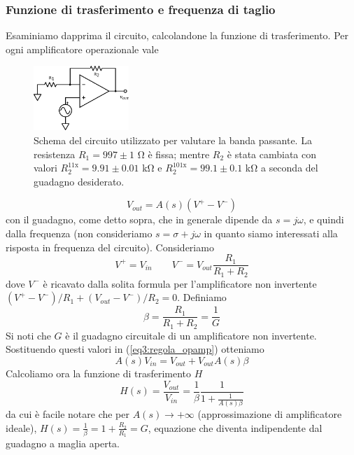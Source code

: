 \subsubsection*{Funzione di trasferimento e frequenza di taglio}

Esaminiamo dapprima il circuito, calcolandone la funzione di trasferimento. Per ogni amplificatore operazionale vale
\begin{figure}
  \begin{center}
    \includegraphics[width=0.32\textwidth]{../E03/latex/bandwidth.pdf}
  \end{center}
  \caption{Schema del circuito utilizzato per valutare la banda passante. La resistenza $R_1=997\pm1$ \si{\ohm} è fissa; mentre $R_2$ è stata cambiata con valori $R_2^{11\mathrm{x}}=9.91 \pm 0.01$ \si{\kilo\ohm} e $R_2^{101\mathrm{x}}=99.1 \pm 0.1$ \si{\kilo\ohm} a seconda del guadagno desiderato.}
  \label{cir3:banda}
\end{figure}
\begin{equation}
V_{out}=A(s) (V^+-V^-)
\label{eq3:regola_opamp}
\end{equation}
con il guadagno, come detto sopra, che in generale dipende da $s=j\omega$, e quindi dalla frequenza (non consideriamo $s=\sigma + j\omega$ in quanto siamo interessati alla risposta in frequenza del circuito). Consideriamo
$$V^+ = V_{in} \qquad V^-=V_{out} \frac{R_1}{R_1+R_2}$$
dove $V^-$ è ricavato dalla solita formula per l'amplificatore non invertente $(V^+-V^-)/R_1 + (V_{out}-V^-)/R_2 =0$. Definiamo
$$\beta = \frac{R_1}{R_1+R_2} = \frac{1}{G}$$
Si noti che $G$ è il guadagno circuitale di un amplificatore non invertente. Sostituendo questi valori in (\ref{eq3:regola_opamp}) otteniamo
$$A(s) V_{in} = V_{out} + V_{out} A(s) \beta$$
Calcoliamo ora la funzione di trasferimento $H$
\begin{equation}
H(s)=\frac{V_{out}}{V_{in}}=\frac{1}{\beta}\frac{1}{1+\frac{1}{A(s) \beta}}
\label{eq3:funz_trasfe}
\end{equation}
da cui è facile notare che per $A(s) \rightarrow + \infty$ (approssimazione di amplificatore ideale), $H(s)=\frac{1}{\beta}=1+\frac{R_2}{R_1}=G$, equazione che diventa indipendente dal guadagno a maglia aperta.

